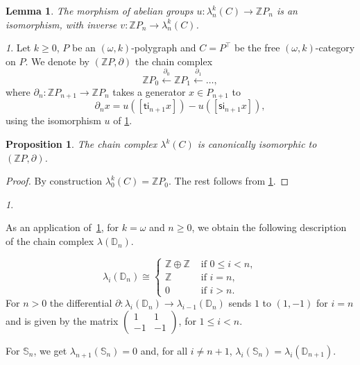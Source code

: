 \documentclass[reqno]{amsart}
\theoremstyle{plain}
\newtheorem{proposition}[subsubsection]{Proposition}
\newtheorem{lemma}[subsubsection]{Lemma}
\theoremstyle{definition}
\theoremstyle{remark}
\newtheorem{paragr}[subsubsection]{} %
\newcommand{\nmbr}[1]{\mathbb #1}
\newcommand{\Z}{\nmbr{Z}}
\newcommand{\pair}[2]{(#1,#2)}       %
\newcommand{\source}{\mathsf{s}} %
\newcommand{\target}{\mathsf{t}} %
\newcommand{\geninc}{\mathsf{i}} %
\newcommand{\functor}[1]{\mathsf{#1}} %
\newcommand{\abel}{\functor{\lambda}} %
\newcommand{\abelk}[1]{\functor{\abel}^{#1}}%
\newcommand{\frgp}[1]{#1^\top} %
\newcommand{\oo}{\ensuremath{\omega}}
\newcommand{\ook}[1]{\ensuremath{\pair{\omega}{#1}}}
\newcommand{\Sph}[1]{\mathbb{S}_{#1}} %
\newcommand{\Dsk}[1]{\mathbb{D}_{#1}} %
\begin{document}
\begin{lemma}\label{lemma:abelpoly}
  The morphism of abelian groups $u \colon \abelk{k}_n(C) \to \Z P_n$ is an
  isomorphism, with inverse $v \colon \Z P_n \to \abelk{k}_n(C)$.
\end{lemma}
\begin{paragr}
  Let $k \geq 0$, $P$ be an \ook k-polygraph and $C=\frgp P$ be the free
  \ook k-category on $P$. We denote by $\pair{\Z P}{\partial}$ the chain complex
  \[
    \Z P_0 \overset{\partial_0}{\longleftarrow} \Z P_1
    \overset{\partial_1}{\longleftarrow} \dots,
    \]
  where $\partial_n\colon \Z P_{n+1}\to \Z P_n$ takes a generator $x\in
  P_{n+1}$ to
  \[\partial_n x=u([\target\geninc_{n+1} x])-u([\source\geninc_{n+1}
    x]),\]
  using the isomorphism $u$ of \cref{lemma:abelpoly}. 
\end{paragr}
\begin{proposition}\label{prop:isocomplex}
  The chain complex $\abelk{k}(C)$
  is canonically isomorphic to~$\pair{\Z P}{\partial}$.
  \end{proposition}

\begin{proof}
  By construction $\abelk{k}_0(C)=\Z P_0$. The rest follows
  from \cref{lemma:abelpoly}.
\end{proof}
\begin{paragr}\label{paragr:abeldisk}
  
  As an application of~\cref{prop:isocomplex}, for $k=\oo$ and $n\geq
  0$,  we obtain the following description of the chain complex $\abel(\Dsk{n})$.

  \[
    \abel_i(\Dsk{n})\cong \begin{cases}
      \Z\oplus\Z &\text{ if } 0 \leq i < n,\\
      \Z &\text{ if } i=n,\\
        0 &\text{ if } i>n. \end{cases}
  \]
  For $n>0$ the differential $\partial
  \colon \abel_i(\Dsk{n}) \to \abel_{i-1}(\Dsk{n})$ sends $1$ to
  $(1,-1)$ for $i=n$ and is given by the matrix $\begin{pmatrix} 1 & 1
    \\ -1 & -1 \end{pmatrix}$, 
  for $1 \leq i < n$.

  For $\Sph{n}$, we get $\abel_{n+1}(\Sph{n})=0$ and, for all $i\neq n+1$, $\abel_i(\Sph{n})=\abel_i(\Dsk{n+1})$. 
\end{paragr}
\end{document}
